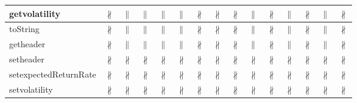 \documentclass[10pt]{article}
\begin{document}
\begin{longtable}{|l|l|l|l|l|l|l|l|l|l|l|l|l|l|l|}
\hline
getvolatility&{\color{BrickRed}$\nparallel$}&{\color{blue}$\parallel$}&{\color{blue}$\parallel$}&{\color{blue}$\parallel$}&{\color{blue}$\parallel$}&{\color{BrickRed}$\nparallel$}&{\color{BrickRed}$\nparallel$}&{\color{BrickRed}$\nparallel$}&{\color{blue}$\parallel$}&{\color{BrickRed}$\nparallel$}&{\color{blue}$\parallel$}&{\color{BrickRed}$\nparallel$}&{\color{blue}$\parallel$}&{\color{BrickRed}$\nparallel$}\\
\hline
toString&{\color{BrickRed}$\nparallel$}&{\color{blue}$\parallel$}&{\color{blue}$\parallel$}&{\color{blue}$\parallel$}&{\color{blue}$\parallel$}&{\color{BrickRed}$\nparallel$}&{\color{BrickRed}$\nparallel$}&{\color{BrickRed}$\nparallel$}&{\color{blue}$\parallel$}&{\color{BrickRed}$\nparallel$}&{\color{blue}$\parallel$}&{\color{BrickRed}$\nparallel$}&{\color{blue}$\parallel$}&{\color{BrickRed}$\nparallel$}\\
\hline
getheader&{\color{BrickRed}$\nparallel$}&{\color{blue}$\parallel$}&{\color{blue}$\parallel$}&{\color{blue}$\parallel$}&{\color{blue}$\parallel$}&{\color{BrickRed}$\nparallel$}&{\color{BrickRed}$\nparallel$}&{\color{BrickRed}$\nparallel$}&{\color{blue}$\parallel$}&{\color{BrickRed}$\nparallel$}&{\color{blue}$\parallel$}&{\color{BrickRed}$\nparallel$}&{\color{blue}$\parallel$}&{\color{BrickRed}$\nparallel$}\\
\hline
setheader&{\color{BrickRed}$\nparallel$}&{\color{BrickRed}$\nparallel$}&{\color{BrickRed}$\nparallel$}&{\color{BrickRed}$\nparallel$}&{\color{BrickRed}$\nparallel$}&{\color{BrickRed}$\nparallel$}&{\color{BrickRed}$\nparallel$}&{\color{BrickRed}$\nparallel$}&{\color{BrickRed}$\nparallel$}&{\color{BrickRed}$\nparallel$}&{\color{BrickRed}$\nparallel$}&{\color{BrickRed}$\nparallel$}&{\color{BrickRed}$\nparallel$}&{\color{BrickRed}$\nparallel$}\\
\hline
setexpectedReturnRate&{\color{BrickRed}$\nparallel$}&{\color{BrickRed}$\nparallel$}&{\color{BrickRed}$\nparallel$}&{\color{BrickRed}$\nparallel$}&{\color{BrickRed}$\nparallel$}&{\color{BrickRed}$\nparallel$}&{\color{BrickRed}$\nparallel$}&{\color{BrickRed}$\nparallel$}&{\color{BrickRed}$\nparallel$}&{\color{BrickRed}$\nparallel$}&{\color{BrickRed}$\nparallel$}&{\color{BrickRed}$\nparallel$}&{\color{BrickRed}$\nparallel$}&{\color{BrickRed}$\nparallel$}\\
\hline
setvolatility&{\color{BrickRed}$\nparallel$}&{\color{BrickRed}$\nparallel$}&{\color{BrickRed}$\nparallel$}&{\color{BrickRed}$\nparallel$}&{\color{BrickRed}$\nparallel$}&{\color{BrickRed}$\nparallel$}&{\color{BrickRed}$\nparallel$}&{\color{BrickRed}$\nparallel$}&{\color{BrickRed}$\nparallel$}&{\color{BrickRed}$\nparallel$}&{\color{BrickRed}$\nparallel$}&{\color{BrickRed}$\nparallel$}&{\color{BrickRed}$\nparallel$}&{\color{BrickRed}$\nparallel$}\\

\end{longtable}
\end{document}
